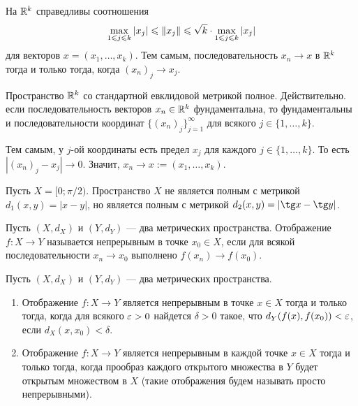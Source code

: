 \documentclass[a4paper]{article}
\theoremstyle{named}
\begin{document}
        \begin{remark*}
            На $\mathbb{R}^k$ справедливы соотношения
            \begin{equation*}
                \max\limits_{1 \leqslant j \leqslant k} |x_j| \leqslant \left\lVert x_j\right\rVert \leqslant \sqrt{k} \cdot \max\limits_{1 \leqslant j \leqslant k} |x_j|
            \end{equation*}
            для векторов $x = (x_1, \dots, x_k)$. Тем самым, последовательность $x_n \to x$ в $\mathbb{R}^k$ тогда и только тогда, когда $(x_n)_j \to x_j$.
        \end{remark*}

        \begin{example*}
            Пространство $\mathbb{R}^k$ со стандартной евклидовой метрикой полное. Действительно. если последовательность векторов $x_n \in \mathbb{R}^k$ фундаментальна, то фундаментальны и последовательности координат $\{(x_n)_j\}_{j = 1}^{\infty}$ для всякого $j \in \{1, \dots, k\}$.

            Тем самым, у $j$-ой координаты есть предел $x_j$ для каждого $j \in \{1, \dots, k\}$. То есть $|(x_n)_j - x_j| \to 0$. Значит, $x_n \to x := (x_1, \dots, x_k)$.
        \end{example*}

        \begin{example*}
            Пусть $X = [0; \pi / 2)$. Пространство $X$ не является полным с метрикой $d_1(x, y) = |x - y|$, но является полным с метрикой $d_2(x, y) = |\tg x - \tg y|$.
        \end{example*}

        \begin{definition*}
            Пусть $(X, d_X)$ и $(Y, d_Y)$ --- два метрических пространства. Отображение $f: X \to Y$ называется непрерывным в точке $x_0 \in X$, если для всякой последовательности $x_n \to x_0$ выполнено $f(x_n) \to f(x_0)$.
        \end{definition*}

        \begin{lemma*}
            Пусть $(X, d_X)$ и $(Y, d_Y)$ --- два метрических пространства.
            \begin{enumerate}
            \item
                Отображение $f: X \to Y$ является непрерывным в точке $x \in X$ тогда и только тогда, когда для всякого $\varepsilon > 0$ найдется $\delta > 0$ такое, что $d_Y(f(x), f(x_0)) < \varepsilon$, если $d_X(x, x_0) < \delta$.

            \item
                Отображение $f: X \to Y$ является непрерывным в каждой точке $x \in X$ тогда и только тогда, когда прообраз каждого открытого множества в $Y$ будет открытым множеством в $X$ (такие отображения будем называть просто непрерывными).
            \end{enumerate}
        \end{lemma*}
\end{document}
